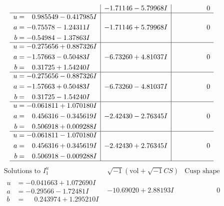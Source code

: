 \documentclass[1p]{elsarticle_modified}
\theoremstyle{definition}
\newcommand{\I}{\sqrt{-1}}
\begin{document}
$$\begin{array}{c|c|c}
 & -1.71146 - 5.79968 I & \phantom{-0.000000 } 0 \\ \hline\begin{aligned}
u &= \phantom{-}0.985549 - 0.417985 I \\
a &= -0.75578 - 1.24311 I \\
b &= -0.54984 - 1.37863 I\end{aligned}
 & -1.71146 + 5.79968 I & \phantom{-0.000000 } 0 \\ \hline\begin{aligned}
u &= -0.275656 + 0.887326 I \\
a &= -1.57663 - 0.50483 I \\
b &= \phantom{-}0.31725 + 1.54240 I\end{aligned}
 & -6.73260 + 4.81037 I & \phantom{-0.000000 } 0 \\ \hline\begin{aligned}
u &= -0.275656 - 0.887326 I \\
a &= -1.57663 + 0.50483 I \\
b &= \phantom{-}0.31725 - 1.54240 I\end{aligned}
 & -6.73260 - 4.81037 I & \phantom{-0.000000 } 0 \\ \hline\begin{aligned}
u &= -0.061811 + 1.070180 I \\
a &= \phantom{-}0.456316 - 0.345619 I \\
b &= \phantom{-}0.506918 + 0.009288 I\end{aligned}
 & -2.42430 - 2.76345 I & \phantom{-0.000000 } 0 \\ \hline\begin{aligned}
u &= -0.061811 - 1.070180 I \\
a &= \phantom{-}0.456316 + 0.345619 I \\
b &= \phantom{-}0.506918 - 0.009288 I\end{aligned}
 & -2.42430 + 2.76345 I & \phantom{-0.000000 } 0\\
 \hline 
 \end{array}$$\newpage$$\begin{array}{c|c|c}  
\text{Solutions to }I^u_{1}& \I (\text{vol} + \sqrt{-1}CS) & \text{Cusp shape}\\
 \hline 
\begin{aligned}
u &= -0.041663 + 1.072690 I \\
a &= -0.29566 - 1.72481 I \\
b &= \phantom{-}0.243974 + 1.295210 I\end{aligned}
 & -10.69020 + 2.88193 I & \phantom{-0.000000 } 0 \\ \hline\begin{aligned}

\end{aligned}
\end{array}$$
\end{document}
